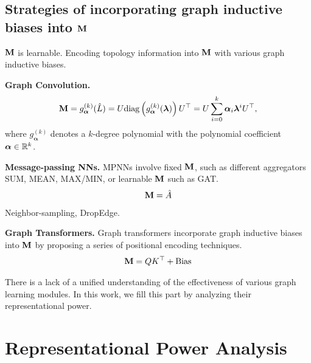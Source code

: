 \documentclass{article} %
\def\valpha{{\bm\alpha}}
\def\vlambda{{\bm\lambda}}
\begin{document}

\subsection{Strategies of incorporating graph inductive biases into ${\mathbf{M}}$}

${\mathbf{M}}$ is learnable.
Encoding topology information into ${\mathbf{M}}$ with various graph inductive biases.

\textbf{Graph Convolution.}
\begin{equation}
	\begin{aligned}
		\rmM=g_{\valpha}^{(k)}(\hat L)=U\mathrm{diag}\left(g_{\valpha}^{(k)}(\vlambda)\right)U^{\top}=U\sum_{i=0}^k\valpha_i\vlambda^iU^{\top},
	\end{aligned}
\end{equation}
where $g_{\valpha}^{(k)}$ denotes a $k$-degree polynomial with the polynomial coefficient $\valpha\in\sR^k$.

\textbf{Message-passing NNs.}
MPNNs involve fixed ${\mathbf{M}}$, such as different aggregators SUM, MEAN, MAX/MIN, or learnable ${\mathbf{M}}$ such as GAT.
\begin{equation}
	\begin{aligned}
		{\mathbf{M}}=\hat A
	\end{aligned}
\end{equation}
Neighbor-sampling, DropEdge.

\textbf{Graph Transformers.}
Graph transformers incorporate graph inductive biases into ${\mathbf{M}}$ by proposing a series of positional encoding techniques.
\begin{equation}
	\begin{aligned}
		{\mathbf{M}}=QK^{\top}+\textrm{Bias}
	\end{aligned}
\end{equation}

There is a lack of a unified understanding of the effectiveness of various graph learning modules.
In this work, we fill this part by analyzing their representational power.

\section{Representational Power Analysis}
\end{document}
